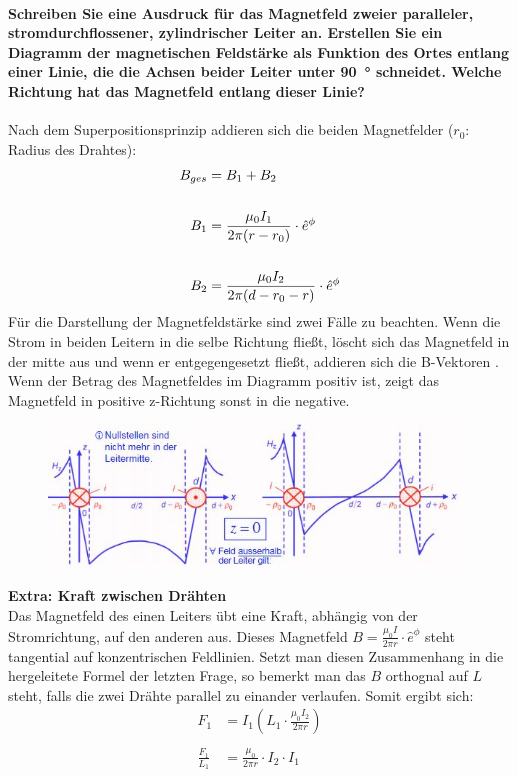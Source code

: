 \documentclass[a4paper, 11pt, ngerman, parskip=half]{scrartcl}
\begin{document}
\paragraph{Schreiben Sie eine Ausdruck für das Magnetfeld zweier paralleler, stromdurchflossener,
zylindrischer Leiter an. Erstellen Sie ein Diagramm der magnetischen Feldstärke als Funktion des
Ortes entlang einer Linie, die die Achsen beider Leiter unter \SI{90}{\degree} schneidet. Welche
Richtung hat das Magnetfeld entlang dieser Linie?} 
Nach dem Superpositionsprinzip addieren sich die beiden Magnetfelder ($r_0$: Radius des Drahtes):
\begin{align}
    B_{ges} &=B_1 + B_2 \notag \\
    \notag \\
    B_1 &= \frac{\mu_0 I_1}{2 \pi (r -r_0)} \cdot \hat{e}^{\phi} \notag \\
    \notag \\
    B_2 &= \frac{\mu_0 I_2}{2 \pi (d-r_0 - r)} \cdot \hat{e}^{\phi} \notag
\end{align}
Für die Darstellung der Magnetfeldstärke sind zwei Fälle zu beachten. Wenn die Strom in beiden Leitern in die selbe Richtung fließt, löscht sich das Magnetfeld in der mitte aus und wenn er entgegengesetzt fließt, addieren sich die B-Vektoren .
Wenn der Betrag des Magnetfeldes im Diagramm positiv ist, zeigt das Magnetfeld in positive z-Richtung sonst in die negative.
\begin{figure}
    \centering
    \includegraphics[width=11cm]{image/5/5.4.jpg}
\end{figure}
\textbf{Extra: Kraft zwischen Drähten}\\
Das Magnetfeld des einen Leiters übt eine Kraft, abhängig von der Stromrichtung, auf den anderen aus.
Dieses Magnetfeld  $B = \frac{\mu_0 I}{2 \pi r} \cdot \hat{e}^{\phi}$ steht tangential auf konzentrischen Feldlinien.
Setzt man diesen Zusammenhang in die hergeleitete Formel der letzten Frage, so bemerkt man das $B$ orthognal auf $L$ steht, falls die zwei Drähte parallel zu einander verlaufen. 
Somit ergibt sich:
\begin{align}
    F_1 &= I_1(L_1 \cdot \frac{\mu_0 I_2}{2 \pi r} ) \\
    \\
    \frac{F_1}{L_1} &= \frac{\mu_0}{2 \pi r} \cdot I_2 \cdot I_1
\end{align}
\newpage
\end{document}
